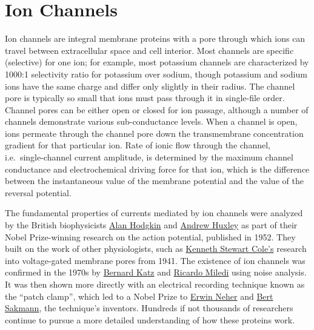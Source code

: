 \hypertarget{ion-channels}{%
\section{Ion Channels}\label{ion-channels}}

Ion channels are integral membrane proteins with a pore through which ions can travel between extracellular space and cell interior. Most channels are specific (selective) for one ion; for example, most potassium channels are characterized by 1000:1 selectivity ratio for potassium over sodium, though potassium and sodium ions have the same charge and differ only slightly in their radius. The channel pore is typically so small that ions must pass through it in single-file order. Channel pores can be either open or closed for ion passage, although a number of channels demonstrate various sub-conductance levels. When a channel is open, ions permeate through the channel pore down the transmembrane concentration gradient for that particular ion. Rate of ionic flow through the channel, i.e.~single-channel current amplitude, is determined by the maximum channel conductance and electrochemical driving force for that ion, which is the difference between the instantaneous value of the membrane potential and the value of the reversal potential.

The fundamental properties of currents mediated by ion channels were analyzed by the British biophysicists \href{https://en.wikipedia.org/wiki/Alan_Hodgkin}{Alan Hodgkin} and \href{https://en.wikipedia.org/wiki/Andrew_Huxley}{Andrew Huxley} as part of their Nobel Prize-winning research on the action potential, published in 1952. They built on the work of other physiologists, such as \href{https://en.wikipedia.org/wiki/Kenneth_Stewart_Cole}{Kenneth Stewart Cole's} research into voltage-gated membrane pores from 1941. The existence of ion channels was confirmed in the 1970s by \href{https://en.wikipedia.org/wiki/Bernard_Katz}{Bernard Katz} and \href{https://en.wikipedia.org/wiki/Ricardo_Miledi}{Ricardo Miledi} using noise analysis. It was then shown more directly with an electrical recording technique known as the ``patch clamp'', which led to a Nobel Prize to \href{https://en.wikipedia.org/wiki/Erwin_Neher}{Erwin Neher} and \href{https://en.wikipedia.org/wiki/Bert_Sakmann}{Bert Sakmann}, the technique's inventors. Hundreds if not thousands of researchers continue to pursue a more detailed understanding of how these proteins work.

